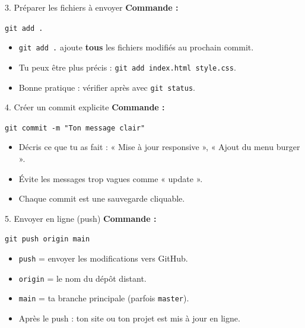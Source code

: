 \documentclass{beamer}
\begin{document}
	\begin{frame}{3. Préparer les fichiers à envoyer}
		\textbf{Commande :}
		\begin{block}{}
			\texttt{git add .}
		\end{block}
		\begin{itemize}
			\item \texttt{git add .} ajoute \textbf{tous} les fichiers modifiés au prochain commit.
			\item Tu peux être plus précis : \texttt{git add index.html style.css}.
			\item Bonne pratique : vérifier après avec \texttt{git status}.
		\end{itemize}
	\end{frame}
	
	\begin{frame}{4. Créer un commit explicite}
		\textbf{Commande :}
		\begin{block}{}
			\texttt{git commit -m "Ton message clair"}
		\end{block}
		\begin{itemize}
			\item Décris ce que tu as fait : « Mise à jour responsive », « Ajout du menu burger ».
			\item Évite les messages trop vagues comme « update ».
			\item Chaque commit est une sauvegarde cliquable.
		\end{itemize}
	\end{frame}
	
	\begin{frame}{5. Envoyer en ligne (push)}
		\textbf{Commande :}
		\begin{block}{}
			\texttt{git push origin main}
		\end{block}
		\begin{itemize}
			\item \texttt{push} = envoyer les modifications vers GitHub.
			\item \texttt{origin} = le nom du dépôt distant.
			\item \texttt{main} = ta branche principale (parfois \texttt{master}).
			\item Après le push : ton site ou ton projet est mis à jour en ligne.
		\end{itemize}
	\end{frame}
	
\end{document}
